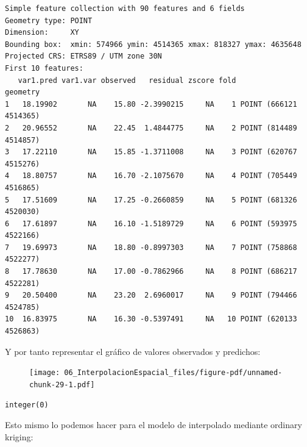 \documentclass[
  letterpaper,
  DIV=11,
  numbers=noendperiod]{scrreprt}
\newenvironment{Shaded}{\begin{snugshade}}{\end{snugshade}}
\newcommand{\AttributeTok}[1]{\textcolor[rgb]{0.40,0.45,0.13}{#1}}
\newcommand{\DecValTok}[1]{\textcolor[rgb]{0.68,0.00,0.00}{#1}}
\newcommand{\FunctionTok}[1]{\textcolor[rgb]{0.28,0.35,0.67}{#1}}
\newcommand{\NormalTok}[1]{\textcolor[rgb]{0.00,0.23,0.31}{#1}}
\newcommand{\SpecialCharTok}[1]{\textcolor[rgb]{0.37,0.37,0.37}{#1}}
\newcommand{\StringTok}[1]{\textcolor[rgb]{0.13,0.47,0.30}{#1}}
\begin{document}
\begin{verbatim}
Simple feature collection with 90 features and 6 fields
Geometry type: POINT
Dimension:     XY
Bounding box:  xmin: 574966 ymin: 4514365 xmax: 818327 ymax: 4635648
Projected CRS: ETRS89 / UTM zone 30N
First 10 features:
   var1.pred var1.var observed   residual zscore fold               geometry
1   18.19902       NA    15.80 -2.3990215     NA    1 POINT (666121 4514365)
2   20.96552       NA    22.45  1.4844775     NA    2 POINT (814489 4514857)
3   17.22110       NA    15.85 -1.3711008     NA    3 POINT (620767 4515276)
4   18.80757       NA    16.70 -2.1075670     NA    4 POINT (705449 4516865)
5   17.51609       NA    17.25 -0.2660859     NA    5 POINT (681326 4520030)
6   17.61897       NA    16.10 -1.5189729     NA    6 POINT (593975 4522166)
7   19.69973       NA    18.80 -0.8997303     NA    7 POINT (758868 4522277)
8   17.78630       NA    17.00 -0.7862966     NA    8 POINT (686217 4522281)
9   20.50400       NA    23.20  2.6960017     NA    9 POINT (794466 4524785)
10  16.83975       NA    16.30 -0.5397491     NA   10 POINT (620133 4526863)
\end{verbatim}

Y por tanto representar el gráfico de valores observados y predichos:

\begin{Shaded}
\end{Shaded}

\begin{figure}[H]

{\centering \texttt{[image: 06\_InterpolacionEspacial\_files/figure-pdf/unnamed-chunk-29-1.pdf]}

}

\end{figure}

\begin{verbatim}
integer(0)
\end{verbatim}

Esto mismo lo podemos hacer para el modelo de interpolado mediante
ordinary kriging:
\end{document}
